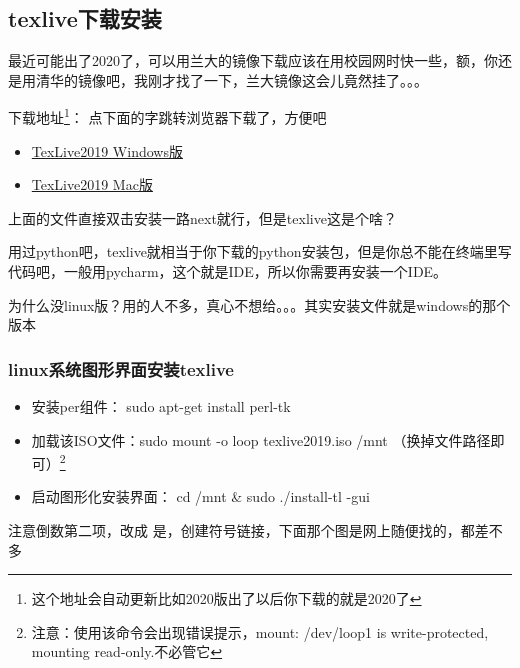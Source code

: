 \documentclass{LZUThesis}
\begin{document}
\subsection{texlive下载安装}
最近可能出了2020了，可以用兰大的镜像下载应该在用校园网时快一些，额，你还是用清华的镜像吧，我刚才找了一下，兰大镜像这会儿竟然挂了。。。

下载地址\footnote{这个地址会自动更新比如2020版出了以后你下载的就是2020了}： 点下面的字跳转浏览器下载了，方便吧

\begin{itemize}
	\item \href{https://mirrors.tuna.tsinghua.edu.cn/CTAN/systems/texlive/Images/texlive.iso}{TexLive2019 \quad Windows版}
	\item \href{http://tug.org/cgi-bin/mactex-download/MacTeX.pkg}{TexLive2019 \quad Mac版}
\end{itemize}

上面的文件直接双击安装一路next就行，但是texlive这是个啥？

用过python吧，texlive就相当于你下载的python安装包，但是你总不能在终端里写代码吧，一般用pycharm，这个就是IDE，所以你需要再安装一个IDE。


为什么没linux版？用的人不多，真心不想给。。。其实安装文件就是windows的那个版本

\subsubsection{linux系统图形界面安装texlive} %
\label{ssub:linux图形界面安装方式}

\begin{itemize}
	\item[1. ] 安装per组件： sudo apt-get install perl-tk
	\item[2. ] 加载该ISO文件：sudo mount -o loop texlive2019.iso /mnt （换掉文件路径即可）\footnote{注意：使用该命令会出现错误提示，mount: /dev/loop1 is write-protected, mounting read-only.不必管它}
	\item[3. ]启动图形化安装界面： cd /mnt \& sudo ./install-tl -gui
\end{itemize}

注意倒数第二项，改成 是，创建符号链接，下面那个图是网上随便找的，都差不多
\end{document}

